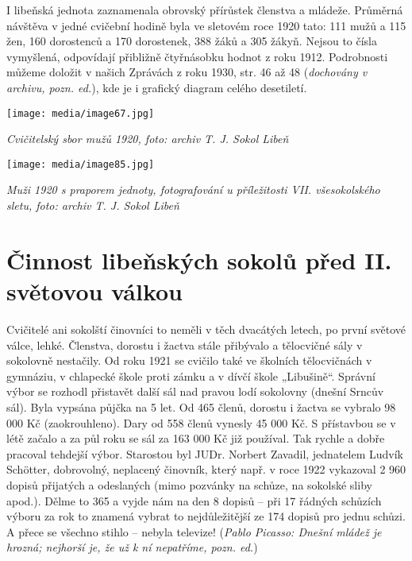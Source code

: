 I libeňská jednota zaznamenala obrovský přírůstek členstva a mládeže.
Průměrná návštěva v jedné cvičební hodině byla ve sletovém roce 1920
tato: 111 mužů a 115 žen, 160 dorostenců a 170 dorostenek, 388 žáků a
305 žákyň. Nejsou to čísla vymyšlená, odpovídají přibližně čtyřnásobku
hodnot z roku 1912. Podrobnosti můžeme doložit v našich Zprávách z roku
1930, str. 46 až 48 (\emph{dochovány v archivu, pozn. ed.}), kde je i
grafický diagram celého desetiletí.

\texttt{[image: media/image67.jpg]}

\emph{Cvičitelský sbor mužů 1920, foto: archiv T. J. Sokol Libeň}

\texttt{[image: media/image85.jpg]}

\emph{Muži 1920 s praporem jednoty, fotografování u příležitosti VII.
všesokolského sletu, foto: archiv T. J. Sokol Libeň}

\section{Činnost libeňských sokolů před II. světovou
válkou}\label{ux10dinnost-libeux148skuxfdch-sokolux16f-pux159ed-ii.-svux11btovou-vuxe1lkou}

Cvičitelé ani sokolští činovníci to neměli v těch dvacátých letech, po
první světové válce, lehké. Členstva, dorostu i žactva stále přibývalo a
tělocvičné sály v sokolovně nestačily. Od roku 1921 se cvičilo také ve
školních tělocvičnách v gymnáziu, v chlapecké škole proti zámku a v
dívčí škole „Libušině``. Správní výbor se rozhodl přistavět další sál
nad pravou lodí sokolovny (dnešní Srncův sál). Byla vypsána půjčka na 5
let. Od 465 členů, dorostu i žactva se vybralo 98 000 Kč (zaokrouhleno).
Dary od 558 členů vynesly 45 000 Kč. S přístavbou se v létě začalo a za
půl roku se sál za 163 000 Kč již používal. Tak rychle a dobře pracoval
tehdejší výbor. Starostou byl JUDr. Norbert Zavadil, jednatelem Ludvík
Schötter, dobrovolný, neplacený činovník, který např. v roce 1922
vykazoval 2 960 dopisů přijatých a odeslaných (mimo pozvánky na schůze,
na sokolské sliby apod.). Dělme to 365 a vyjde nám na den 8 dopisů --
při 17 řádných schůzích výboru za rok to znamená vybrat to
nejdůležitější ze 174 dopisů pro jednu schůzi. A přece se všechno stihlo
-- nebyla televize! (\emph{Pablo Picasso: Dnešní mládež je hrozná;
nejhorší je, že už k ní nepatříme, pozn. ed.})

